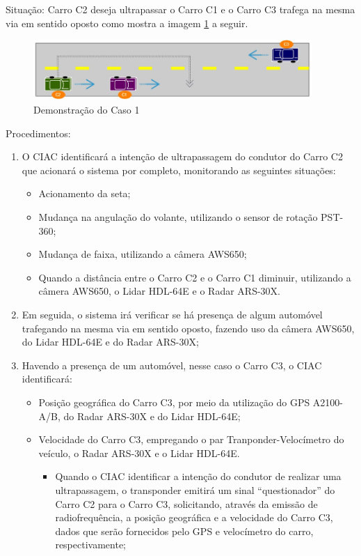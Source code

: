 Situação: Carro C2 deseja ultrapassar o Carro C1 e o Carro C3 trafega na mesma
via em sentido oposto como mostra a imagem \ref{fig:caso1} a seguir.

\begin{figure}[h]
  \centering
  \includegraphics[width=400px, scale=1]{figuras/caso1}
  \caption{Demonstração do Caso 1}
\label{fig:caso1}
\end{figure}

Procedimentos:

\begin{enumerate}
  \item O CIAC identificará a intenção de ultrapassagem do condutor do Carro
  C2 que acionará o sistema por completo, monitorando as seguintes situações:
  \begin{itemize}
    \item Acionamento da seta;
    \item Mudança na angulação do volante, utilizando o sensor de rotação PST-360;
    \item Mudança de faixa, utilizando a câmera AWS650;
    \item Quando a distância entre o Carro C2 e o Carro C1 diminuir, utilizando a
    câmera AWS650, o Lidar HDL-64E e o Radar ARS-30X.
  \end{itemize}

  \item Em seguida, o sistema irá verificar se há presença de algum automóvel
  trafegando na mesma via em sentido oposto, fazendo uso da câmera AWS650, do
  Lidar HDL-64E e do Radar ARS-30X;

  \item Havendo a presença de um automóvel, nesse caso o Carro C3, o CIAC identificará:
  \begin{itemize}
    \item Posição geográfica do Carro C3, por meio da utilização do GPS
    A2100-A/B, do Radar ARS-30X e do Lidar HDL-64E;

    \item Velocidade do Carro C3, empregando o par Tranponder-Velocímetro do
    veículo, o Radar ARS-30X e o Lidar HDL-64E.
    \begin{itemize}
      \item Quando o CIAC identificar a intenção do condutor de realizar uma
      ultrapassagem, o transponder emitirá um sinal “questionador” do Carro C2
      para o Carro C3, solicitando, através da emissão de radiofrequência, a
      posição geográfica e a velocidade do Carro C3, dados que serão fornecidos
      pelo GPS e velocímetro do carro, respectivamente;


\end{itemize}
\end{itemize}
\end{enumerate}
